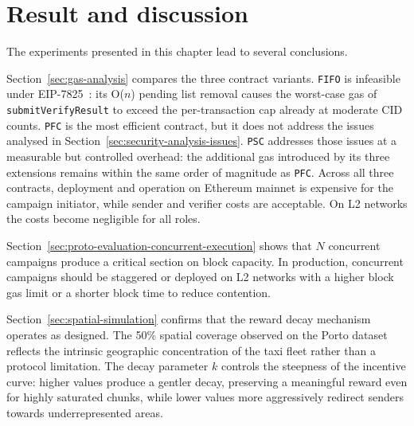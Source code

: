 \section{Result and discussion}\label{sec:result-discussion}

The experiments presented in this chapter lead to several conclusions.

Section~\ref{sec:gas-analysis} compares the three contract variants.
\texttt{FIFO} is infeasible under EIP-7825~\cite{eip7825}: its O($n$) pending
list removal causes the worst-case gas of \texttt{submitVerifyResult} to exceed
the per-transaction cap already at moderate CID counts.
\texttt{PFC} is the most efficient contract, but it does not address the issues
analysed in Section~\ref{sec:security-analysis-issues}.
\texttt{PSC} addresses those issues at a measurable but controlled overhead: the
additional gas introduced by its three extensions remains within the same order
of magnitude as \texttt{PFC}.
Across all three contracts, deployment and operation on Ethereum mainnet is
expensive for the campaign initiator, while sender and verifier costs are
acceptable.
On L2 networks the costs become negligible for all roles.

Section~\ref{sec:proto-evaluation-concurrent-execution} shows that $N$ concurrent
campaigns produce a critical section on block capacity.
In production, concurrent campaigns should be staggered or deployed on L2 networks
with a higher block gas limit or a shorter block time to reduce contention.

Section~\ref{sec:spatial-simulation} confirms that the reward decay mechanism
operates as designed.
The 50\% spatial coverage observed on the Porto dataset reflects the intrinsic
geographic concentration of the taxi fleet rather than a protocol limitation.
The decay parameter $k$ controls the steepness of the incentive curve: higher
values produce a gentler decay, preserving a meaningful reward even for
highly saturated chunks, while lower values more aggressively redirect senders
towards underrepresented areas.